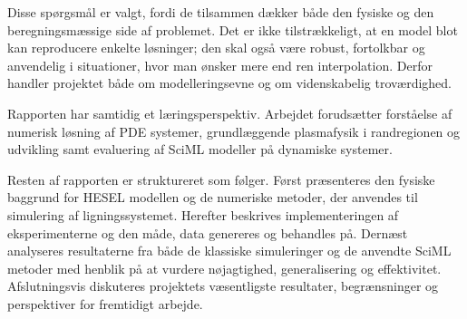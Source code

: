 Disse spørgsmål er valgt, fordi de tilsammen dækker både den fysiske og den beregningsmæssige side af problemet. Det er ikke tilstrækkeligt, at en model blot kan reproducere enkelte løsninger; den skal også være robust, fortolkbar og anvendelig i situationer, hvor man ønsker mere end ren interpolation. Derfor handler projektet både om modelleringsevne og om videnskabelig troværdighed.

Rapporten har samtidig et læringsperspektiv. Arbejdet forudsætter forståelse af numerisk løsning af PDE systemer, grundlæggende plasmafysik i randregionen og udvikling samt evaluering af SciML modeller på dynamiske systemer. 

Resten af rapporten er struktureret som følger. Først præsenteres den fysiske baggrund for HESEL modellen og de numeriske metoder, der anvendes til simulering af ligningssystemet. Herefter beskrives implementeringen af eksperimenterne og den måde, data genereres og behandles på. Dernæst analyseres resultaterne fra både de klassiske simuleringer og de anvendte SciML metoder med henblik på at vurdere nøjagtighed, generalisering og effektivitet. Afslutningsvis diskuteres projektets væsentligste resultater, begrænsninger og perspektiver for fremtidigt arbejde.
